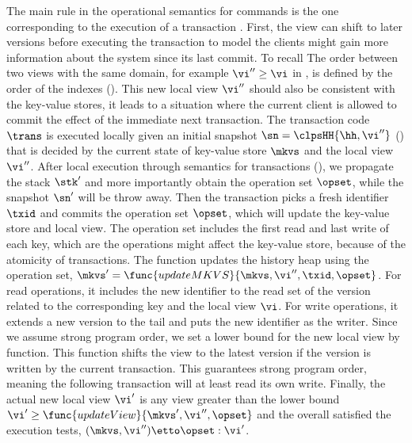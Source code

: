 The main rule in the operational semantics for commands is the one corresponding to the execution of a transaction .
First, the view can shift to later versions before executing the transaction to model the clients might gain more information about the system since its last commit.
To recall The order between two views  with the same domain, for example \( \vi'' \geq \vi \) in , is defined by the order of the indexes ().
This new local view \( \vi'' \) should also be consistent with the key-value stores, \ie it leads to a situation where the current client is allowed to commit the effect of the immediate next transaction.
The transaction code \( \trans \) is executed locally given an initial snapshot \( \sn = \clpsHH{\hh, \vi''}\) () that is decided by the current state of key-value store \( \mkvs \) and the local view \( \vi'' \).
After local execution through semantics for transactions (), we propagate the stack \( \stk' \) and more importantly obtain the operation set \( \opset \), while the snapshot \( \sn' \) will be throw away.
Then the transaction picks a fresh identifier \( \txid \) and commits the operation set \( \opset \), which will update the key-value store and local view.
The operation set includes the first read and last write of each key, which are the operations might affect the key-value store, because of the atomicity of transactions.
The  function updates the history heap using the operation set, \( \mkvs' = \func{updateMKVS}{\mkvs,\vi'',\txid, \opset}\).
For read operations, it includes the new identifier to the read set of the version related to the corresponding key and the local view \( \vi \).
For write operations, it extends a new version to the tail and puts the new identifier as the writer.
Since we assume strong program order, we set a lower bound for the new local view by  function.
This function shifts the view to the latest version if the version is written by the current transaction.
This guarantees strong program order, meaning the following transaction will at least read its own write.
Finally, the actual new local view \( \vi' \) is any view greater than the lower bound \( \vi' \geq \func{updateView}{\mkvs', \vi'', \opset}\) and the overall satisfied the execution tests, \ie \( (\mkvs, \vi'') \etto \opset : \vi'\).

